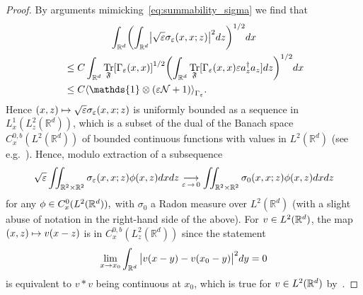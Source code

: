 \documentclass[10pt]{amsart}
\theoremstyle{definition}\newtheorem{defi}[theo]{Definition}\newtheorem{rema}[theo]{Remark}\newtheorem{exam}[theo]{Example}\newtheorem{exem}[theo]{Example}\newtheorem{nota}[theo]{Notation}
\DeclareMathOperator{\Tr}{Tr}
\newcommand{\R}{\mathbb{R}}
\newcommand{\cN}{\mathcal{N}}
\newcommand{\gF}{\mathfrak{F}}
\newcommand{\1}{\mathds{1}}
\newcommand{\eps}{\varepsilon}
\let\oldin\in
\renewcommand{\in}{\mathchoice{\oldin}{\oldin}{\,\oldin\,}{\,\oldin\,}}
\renewcommand*{\to}{\mathchoice{\longrightarrow}{\rightarrow}{\rightarrow}{\rightarrow}}
\let\oldmapsto\mapsto
\renewcommand*{\mapsto}{\mathchoice{\longmapsto}{\oldmapsto}{\oldmapsto}{\oldmapsto}}
\let\originalleft\left
\let\originalright\right
\renewcommand{\left}{\mathopen{}\mathclose\bgroup\originalleft}
\renewcommand{\right}{\aftergroup\egroup\originalright}
\begin{document}
\begin{proof}
By arguments mimicking~\eqref{eq:summability_sigma} we find that
\begin{multline*}
\int_{\R^d} \left(\int_{\R^d} \left|\sqrt{\eps}\sigma_{\eps} (x,x;z)\right|^2 dz \right) ^{1/2}dx\\
\begin{aligned}
&\leq C \int_{\R^d} \Tr_\gF \left[\Gamma_\eps (x,x)\right] ^{1 / 2} \left(\int_{\R^d} \Tr_\gF [\Gamma_\eps (x,x) \eps a^\dagger_z a_z] dz \right)^{1/2} dx \\
&\leq C\left\langle \1 \otimes \left(\eps \cN +1 \right)\right\rangle_{\Gamma_\eps}.
\end{aligned}
\end{multline*}
Hence $(x,z)\mapsto \sqrt{\eps} \sigma_{\eps} (x,x;z)$ is uniformly bounded as a sequence in $L^1_x (L^2_z (\R^d))$, which is a subset of the dual of the Banach space $C_x^{0,b} (L^2 (\R^d))$ of bounded continuous functions with values in $L^2 (\R^d)$ (see e.g.~\cite{HytNeeVerWei-16}). Hence, modulo extraction of a subsequence
\begin{equation*}
\sqrt{\eps}\iint_{\R^2 \times \R^2} \sigma_{\eps} (x,x;z) \phi(x,z) dx dz \underset{\eps\,\to\,0}{\to} \iint_{\R^2 \times \R^2} \sigma_{0} (x,x;z) \phi(x,z) dx dz
\end{equation*}
for any $\phi\in C_x^0 (L^2 (\R^d)),$ with $\sigma_0$ a Radon measure over $L^2 (\R^d)$ (with a slight abuse of notation in the right-hand side of the above). For $v\in L^2 (\R^d)$, the map $(x,z) \mapsto v(x-z)$ is in $C_x^{0,b} (L^2_z (\R^d))$ since the statement
\begin{equation*}
\lim_{x\to x_0} \int_{\R^d} \big| v(x-y)-v(x_0-y)\big|^2 dy=0
\end{equation*}
is equivalent to $v\ast v$ being continuous at $x_0$, which is true for $v\in L^2 (\R^d)$ by~\cite[Proposition~8.8]{Folland-99}.


\end{proof}
\end{document}
